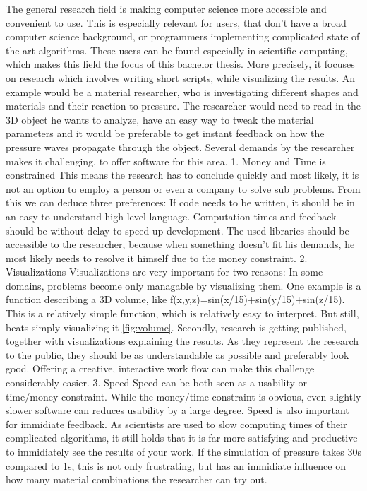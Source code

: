 The general research field is making computer science more accessible and convenient to use. This is especially relevant for users, that don't have a broad computer science background, or programmers implementing complicated state of the art algorithms.
These users can be found especially in scientific computing, which makes this field the focus of this bachelor thesis. 
More precisely, it focuses on research which involves writing short scripts, while visualizing the results. 
An example would be a material researcher, who is investigating different shapes and materials and their reaction to pressure.
The researcher would need to read in the 3D object he wants to analyze, have an easy way to tweak the material parameters and it would be preferable to get instant feedback on how the pressure waves propagate through the object. 
Several demands by the researcher makes it challenging, to offer software for this area.
1. Money and Time is constrained
This means the research has to conclude quickly and most likely, it is not an option to employ a person or even a company to solve sub problems.
From this we can deduce three preferences: If code needs to be written, it should be in an easy to understand high-level language. Computation times and feedback should be without delay to speed up development. The used libraries should be accessible to the researcher, because when something doesn't fit his demands, he most likely needs to resolve it himself due to the money constraint.
2. Visualizations
Visualizations are very important for two reasons:
In some domains, problems become only managable by visualizing them. One example is a function describing a 3D volume, like f(x,y,z)=sin(x/15)+sin(y/15)+sin(z/15). This is a relatively simple function, which is relatively easy to interpret. But still, beats simply visualizing it \ref{fig:volume}.
Secondly, research is getting published, together with visualizations explaining the results. As they represent the research to the public, they should be as understandable as possible and preferably look good.
Offering a creative, interactive work flow can make this challenge considerably easier.
3. Speed
Speed can be both seen as a usability or time/money constraint. While the money/time constraint is obvious, even slightly slower software can reduces usability by a large degree.
Speed is also important for immidiate feedback. As scientists are used to slow computing times of their complicated algorithms, it still holds that it is far more satisfying and productive to immidiately see the results of your work. If the simulation of pressure takes 30s compared to 1s, this is not only frustrating, but has an immidiate influence on how many material combinations the researcher can try out.



